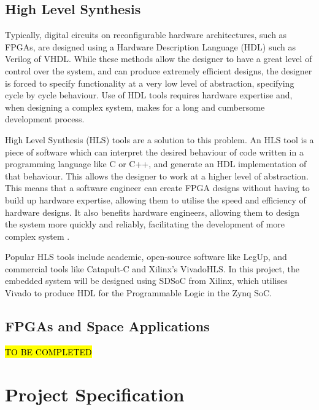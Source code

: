 \documentclass[12pt]{article}
\begin{document}
\subsection{High Level Synthesis}
\label{sec:Background-HLS}
\vspace{-12pt}

Typically, digital circuits on reconfigurable hardware architectures, such as FPGAs, are designed using a Hardware Description Language (HDL) such as Verilog of VHDL. While these methods allow the designer to have a great level of control over the system, and can produce extremely efficient designs, the designer is forced to specify functionality at a very low level of abstraction, specifying cycle by cycle behaviour. Use of HDL tools requires hardware expertise and, when designing a complex system, makes for a long and cumbersome development process.

High Level Synthesis (HLS) tools are a  solution to this problem. An HLS tool is a piece of software which can interpret the desired behaviour of code written in a programming language like C or C++, and generate an HDL implementation of that behaviour. This allows the designer to work at a higher level of abstraction.  This means that a software engineer can create FPGA designs without having to build up hardware expertise, allowing them to utilise the speed and efficiency of hardware designs. It also benefits hardware engineers, allowing them to design the system more quickly and reliably, facilitating the development of more complex system \cite{HLS}.

Popular HLS tools include academic, open-source software like LegUp, and commercial tools like Catapult-C and Xilinx's VivadoHLS. In this project, the embedded system will be designed using SDSoC from Xilinx, which utilises Vivado to produce HDL for the Programmable Logic in the Zynq SoC.

\subsection{FPGAs and Space Applications}
\label{sec:Background-FPGAsAndSpaceApplications}
\vspace{-12pt}

\hl{TO BE COMPLETED}

\section{Project Specification}
\label{sec:ProjSpec}
\vspace{-12pt}
\end{document}
